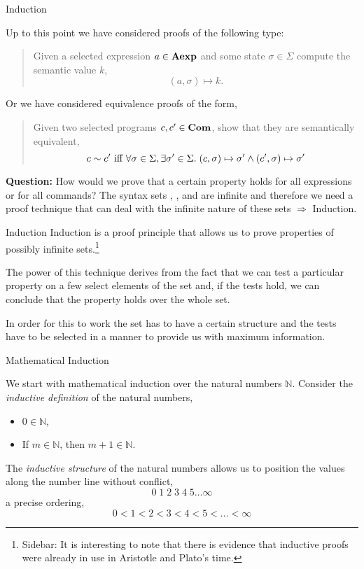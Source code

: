 \documentclass{beamer}
\begin{document}
\begin{frame}{Induction}

\small
Up to this point we have considered proofs of the following type:
\begin{quote}
Given  a {\color{red}selected expression} $a \in \mbox{\bf Aexp}$ and some state $\sigma \in \Sigma$ compute the semantic value $k$,
\[
	(a,\sigma)\mapsto k.
\]
\end{quote}
Or we have considered equivalence proofs of the form,
\begin{quote}
Given two {\color{red}selected programs} $c,c'\in \mbox{\bf Com}$, show that they are semantically equivalent,
\[
c \sim c' \mbox{ \rm iff } \forall \sigma\in\Sigma, \exists \sigma' \in \Sigma.\; ( {c}, {\sigma} ) \mapsto {\sigma'} \wedge ( {c'}, {\sigma} ) \mapsto {\sigma'}
\]
\end{quote}

{\bf Question:} How would we prove that a certain property holds {\color{red} for all expressions} or {\color{red}for all
commands}?   The syntax sets , , and  are infinite and therefore
we need a proof technique that can deal with the infinite nature of these sets $\Rightarrow$ Induction.
\end{frame}

\begin{frame}{Induction}
Induction is a proof principle that allows us to prove properties of possibly infinite sets.\footnote{\tiny Sidebar:  It is interesting to note that there is evidence that inductive proofs were already
in use in Aristotle and Plato's time.}

\vspace{.1in}

The power of this technique derives from the fact that we can test a particular property on a few
select elements of the set and,
if the tests hold, we can conclude that the property holds over the whole set.

\vspace{.1in}

In order for this to work the set has to have a certain structure and the tests have to be 
selected in a manner to provide us with maximum information.
\end{frame}


\begin{frame}{Mathematical Induction}

\small
We start with mathematical induction over the natural numbers $\mathbb{N}$.
Consider the {\em inductive definition} of the natural numbers,
\begin{itemize}
\item $0\in \mathbb{N}$,
\item If $m\in \mathbb{N}$, then $m + 1 \in \mathbb{N}$.
\end{itemize}
The {\em inductive structure} of the natural numbers allows us to position the values along the
number line without conflict,
\[
0\;1\;2\;3\;4\;5\ldots\infty
\]
a precise ordering,
\[
0 < 1 < 2 < 3 < 4 < 5 < \ldots < \infty
\]
\end{frame}
\end{document}
